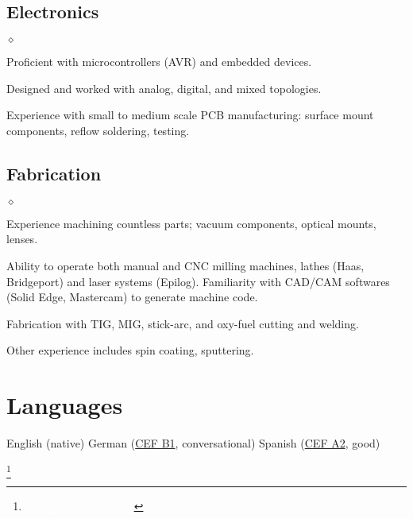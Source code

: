 \documentclass{webster-resume}
\newenvironment{list3}{
  \begin{list}{$\diamond$}{%
      \setlength{\itemsep}{-0.05in}
      \setlength{\parsep}{.05in} \setlength{\parskip}{0in}
      \setlength{\topsep}{0in} \setlength{\partopsep}{0in} 
      \setlength{\leftmargin}{0.2in}}}{\end{list}}
\begin{document}
\subsection{Electronics}
\begin{list3}
\item Proficient with microcontrollers (AVR) and embedded devices. 
\item Designed and worked with analog, digital, and mixed topologies.
\item Experience with small to medium scale PCB manufacturing: surface mount components, reflow
soldering, testing.
\end{list3}
\vspace{-1em}

\subsection{Fabrication}
\begin{list3}
\item Experience machining countless parts; vacuum components,
optical mounts, lenses.
\item Ability to operate both manual and CNC milling machines, lathes
 (Haas, Bridgeport) and laser systems (Epilog).  Familiarity with CAD/CAM
	softwares (Solid Edge, Mastercam) to generate machine code.
\item Fabrication with TIG, MIG, stick-arc, and oxy-fuel cutting and
welding.
\item Other experience includes spin coating, sputtering.
\end{list3}
\vspace{-1em}

\section{Languages}
\vspace{-0.25em}
English (native)
German (\href{http://en.wikipedia.org/wiki/Common_European_Framework_of_Reference_for_Languages}{CEF B1}, conversational)
Spanish (\href{http://en.wikipedia.org/wiki/Common_European_Framework_of_Reference_for_Languages}{CEF A2}, good)

\let\thefootnote\relax\footnote{\textcolor{white}{%
Compiled \today, %
}}
\end{document}

